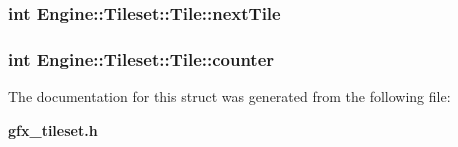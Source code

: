 \subsubsection{\setlength{\rightskip}{0pt plus 5cm}int {\bf Engine::Tileset::Tile::nextTile}}\label{structEngine_1_1Tileset_1_1Tile_226048baa69710fc71749fe8df0b0e59}


\subsubsection{\setlength{\rightskip}{0pt plus 5cm}int {\bf Engine::Tileset::Tile::counter}}\label{structEngine_1_1Tileset_1_1Tile_7366117a62ad5bd0c96765cc96a3f0df}




The documentation for this struct was generated from the following file:\begin{CompactItemize}
\item 
{\bf gfx\_\-tileset.h}\end{CompactItemize}
